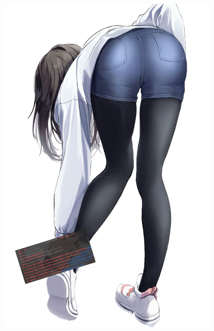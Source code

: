 \begin{enumerate}
    \begin{figure}[H]
        \centering
        \includegraphics[scale=2]{img/Ex4pics/upala}
    \end{figure}

    \newpage

    \thispagestyle{empty}

    \BgThispage


\end{enumerate}
